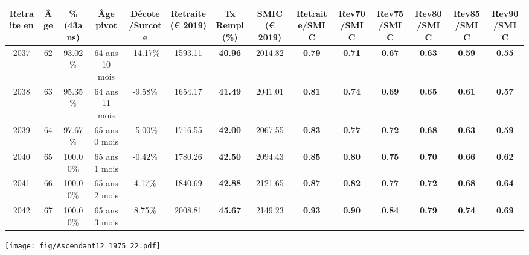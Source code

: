 \begin{adjustbox}{max width=\textwidth} 
\begin{tabular}[htb]{|c|c||c|c|c||c|c||c||c|c|c|c|c|c|} 
\hline 
 Retraite en &  Âge &  \%(43ans) &  Âge pivot &  Décote/Surcote &  Retraite (\euro{} 2019) &  Tx Rempl(\%) &  SMIC (\euro{} 2019) &  Retraite/SMIC &  Rev70/SMIC &  Rev75/SMIC &  Rev80/SMIC &  Rev85/SMIC &  Rev90/SMIC \\ 
\hline \hline 
 2037 &  62 &  93.02\% &  64 ans 10 mois &  -14.17\% &  1593.11 &  {\bf 40.96} &  2014.82 &  {\bf {\color{red} 0.79}} &  {\bf {\color{red} 0.71}} &  {\bf {\color{red} 0.67}} &  {\bf {\color{red} 0.63}} &  {\bf {\color{red} 0.59}} &  {\bf {\color{red} 0.55}} \\ 
\hline 
 2038 &  63 &  95.35\% &  64 ans 11 mois &  -9.58\% &  1654.17 &  {\bf 41.49} &  2041.01 &  {\bf {\color{red} 0.81}} &  {\bf {\color{red} 0.74}} &  {\bf {\color{red} 0.69}} &  {\bf {\color{red} 0.65}} &  {\bf {\color{red} 0.61}} &  {\bf {\color{red} 0.57}} \\ 
\hline 
 2039 &  64 &  97.67\% &  65 ans 0 mois &  -5.00\% &  1716.55 &  {\bf 42.00} &  2067.55 &  {\bf {\color{red} 0.83}} &  {\bf {\color{red} 0.77}} &  {\bf {\color{red} 0.72}} &  {\bf {\color{red} 0.68}} &  {\bf {\color{red} 0.63}} &  {\bf {\color{red} 0.59}} \\ 
\hline 
 2040 &  65 &  100.00\% &  65 ans 1 mois &  -0.42\% &  1780.26 &  {\bf 42.50} &  2094.43 &  {\bf {\color{red} 0.85}} &  {\bf {\color{red} 0.80}} &  {\bf {\color{red} 0.75}} &  {\bf {\color{red} 0.70}} &  {\bf {\color{red} 0.66}} &  {\bf {\color{red} 0.62}} \\ 
\hline 
 2041 &  66 &  100.00\% &  65 ans 2 mois &  4.17\% &  1840.69 &  {\bf 42.88} &  2121.65 &  {\bf {\color{red} 0.87}} &  {\bf {\color{red} 0.82}} &  {\bf {\color{red} 0.77}} &  {\bf {\color{red} 0.72}} &  {\bf {\color{red} 0.68}} &  {\bf {\color{red} 0.64}} \\ 
\hline 
 2042 &  67 &  100.00\% &  65 ans 3 mois &  8.75\% &  2008.81 &  {\bf 45.67} &  2149.23 &  {\bf {\color{red} 0.93}} &  {\bf {\color{red} 0.90}} &  {\bf {\color{red} 0.84}} &  {\bf {\color{red} 0.79}} &  {\bf {\color{red} 0.74}} &  {\bf {\color{red} 0.69}} \\ 
\hline 
\hline 
\end{tabular} 
\end{adjustbox} 
 
 \vspace{0.1cm} 

 \begin{center}\texttt{[image: fig/Ascendant12\_1975\_22.pdf]}\end{center} \label{fig/Ascendant12_1975_22.pdf} 


